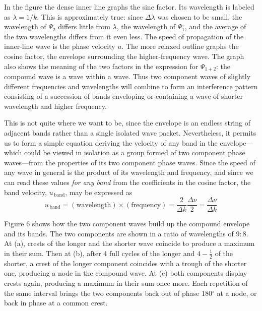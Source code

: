 In the figure the dense inner line graphs the sine factor. Its wavelength is
labeled as $\lambda = 1/k$. This is approximately true: since
$\Delta\lambda$ was chosen to be small, the wavelength of $\Psi_2$ differs
little from $\lambda$, the wavelength of $\Psi_1$, and the average of
the two wavelengths differs from it even less. The speed of propagation
of the inner-line wave is the phase velocity $u$. The more relaxed
outline graphs the cosine factor, the envelope surrounding the
higher-frequency wave. The graph also shows the meaning of the two factors in
the expression for $\Psi_{1+2}$: the compound wave is a wave within a
wave. Thus two component waves of slightly different frequencies and
wavelengths will combine to form an interference pattern consisting of a
succession of bands enveloping or containing a wave of shorter
wavelength and higher frequency.

This is not quite where we want to be, since the envelope is an endless
string of adjacent bands rather than a single isolated wave packet.
Nevertheless, it permits us to form a simple equation deriving the
velocity of any band in the envelope---which could be viewed in
isolation as a group formed of two component phase waves---from the
properties of its two component phase waves. Since the speed of any wave
in general is the product of its wavelength and frequency, and since we
can read these values \emph{for any band} from the coefficients in the
cosine factor, the band velocity, $u_{\,\text{band}}$, may be
expressed as
\begin{equation*}\tag{2}
u_{\,\textrm{band}} = (\text{wavelength})\times (\text{frequency}) = \frac{2}{\Delta k}\frac{\Delta\nu}{2} = 
\frac{\Delta\nu}{\Delta k}
\end{equation*}

Figure 6 shows how the two component waves build up the compound
envelope and its bands. The two components are shown in a ratio of
wavelengths of $9:8$. At (a), crests of the longer and the shorter wave
coincide to produce a maximum in their sum. Then at (b), after 4 full
cycles of the longer and $4-\frac{1}{2}$ of the shorter, a crest of the longer
component coincides with a trough of the shorter one, producing a node
in the compound wave. At (c) both components display crests again,
producing a maximum in their sum once more. Each repetition of the same
interval brings the two components back out of phase 180$^{\circ}$ at a node, or
back in phase at a common crest.

